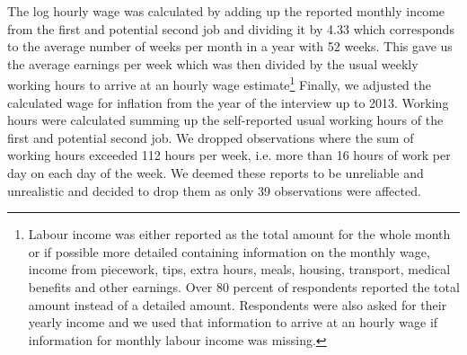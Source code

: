 The log hourly wage was calculated by adding up the reported monthly
income from the first and potential second job and dividing it by
4.33 which corresponds to the average number of weeks per month in
a year with 52 weeks. This gave us the average earnings per week which
was then divided by the usual weekly working hours to arrive at an
hourly wage estimate\footnote{Labour income was either reported as the total amount for the whole
month or if possible more detailed containing information on the monthly
wage, income from piecework, tips, extra hours, meals, housing, transport,
medical benefits and other earnings. Over 80 percent of respondents
reported the total amount instead of a detailed amount. Respondents
were also asked for their yearly income and we used that information
to arrive at an hourly wage if information for monthly labour income
was missing.} Finally, we adjusted the calculated wage for inflation from the year
of the interview up to 2013. Working hours were calculated summing
up the self-reported usual working hours of the first and potential
second job. We dropped observations where the sum of working hours
exceeded 112 hours per week, i.e. more than 16 hours of work per day
on each day of the week. We deemed these reports to be unreliable
and unrealistic and decided to drop them as only 39 observations were
affected.

